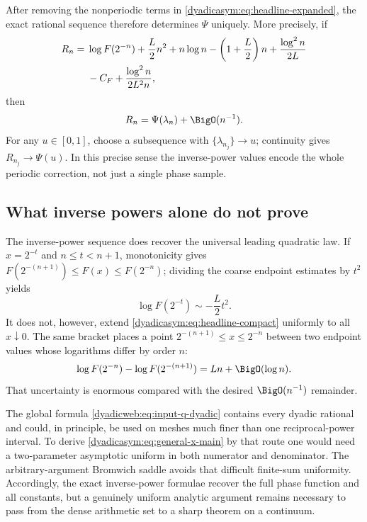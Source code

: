 \documentclass[11pt,oneside]{article}
\theoremstyle{definition}
\theoremstyle{remark}
\begin{document}
After removing the nonperiodic terms in \eqref{dyadicasym:eq:headline-expanded}, the exact rational
sequence therefore determines $\Psi$ uniquely.  More precisely, if
\begin{align}
 R_n={}&\log F(2^{-n})+\frac L2n^2+n\log n-
 \left(1+\frac L2\right)n+\frac{\log^2n}{2L}               \notag\\
 &-C_F+\frac{\log^2n}{2L^2n},                              \label{dyadicasym:eq:renormalized-Rn}
\end{align}
then
\begin{equation}
 R_n=\Psi(\lambda_n)+\BigO(n^{-1}).                         \label{dyadicasym:eq:Rn-Psi}
\end{equation}
For any $u\in[0,1]$, choose a subsequence with
$\{\lambda_{n_j}\}\to u$; continuity gives $R_{n_j}\to\Psi(u)$.  In this precise sense the
inverse-power values encode the whole periodic correction, not just a single phase sample.

\subsection{What inverse powers alone do not prove}

The inverse-power sequence does recover the universal leading quadratic law.  If
$x=2^{-t}$ and $n\le t<n+1$, monotonicity gives
$F(2^{-(n+1)})\le F(x)\le F(2^{-n})$; dividing the coarse endpoint estimates by
$t^2$ yields
\begin{equation}
 \log F(2^{-t})\sim-\frac L2t^2.
 \label{dyadicasym:eq:monotone-leading-law}
\end{equation}
It does not, however, extend \eqref{dyadicasym:eq:headline-compact} uniformly to all
$x\downarrow0$.  The same bracket places a point
$2^{-(n+1)}\le x\le2^{-n}$ between two endpoint values whose logarithms differ by order $n$:
\begin{equation}
 \log F(2^{-n})-\log F(2^{-(n+1)})=Ln+\BigO(\log n).        \label{dyadicasym:eq:dyadic-gap}
\end{equation}
That uncertainty is enormous compared with the desired $\BigO(n^{-1})$ remainder.

The global formula \eqref{dyadicweb:eq:input-q-dyadic} contains every dyadic rational and could, in principle,
be used on meshes much finer than one reciprocal-power interval.  To derive
\eqref{dyadicasym:eq:general-x-main} by that route one would need a two-parameter asymptotic uniform in
both numerator and denominator.  The arbitrary-argument Bromwich saddle avoids that difficult
finite-sum uniformity.  Accordingly, the exact inverse-power formulae recover the full phase
function and all constants, but a genuinely uniform analytic argument remains necessary to
pass from the dense arithmetic set to a sharp theorem on a continuum.
\end{document}
